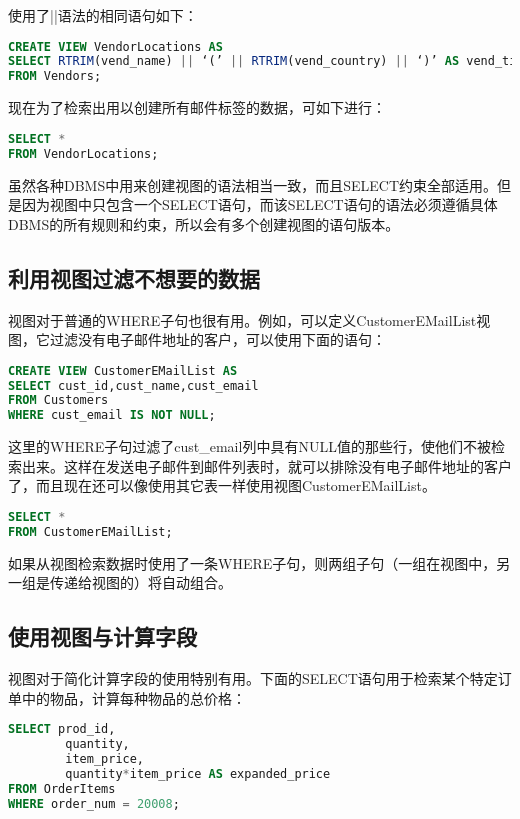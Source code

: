 使用了||语法的相同语句如下：

\begin{lstlisting}[language=SQL]
CREATE VIEW VendorLocations AS
SELECT RTRIM(vend_name) || ‘(’ || RTRIM(vend_country) || ‘)’ AS vend_title
FROM Vendors;
\end{lstlisting}

现在为了检索出用以创建所有邮件标签的数据，可如下进行：

\begin{lstlisting}[language=SQL]
SELECT *
FROM VendorLocations;
\end{lstlisting}

虽然各种DBMS中用来创建视图的语法相当一致，而且SELECT约束全部适用。但是因为视图中只包含一个SELECT语句，而该SELECT语句的语法必须遵循具体DBMS的所有规则和约束，所以会有多个创建视图的语句版本。


\subsection{利用视图过滤不想要的数据}


视图对于普通的WHERE子句也很有用。例如，可以定义CustomerEMailList视图，它过滤没有电子邮件地址的客户，可以使用下面的语句：

\begin{lstlisting}[language=SQL]
CREATE VIEW CustomerEMailList AS
SELECT cust_id,cust_name,cust_email
FROM Customers
WHERE cust_email IS NOT NULL;
\end{lstlisting}

这里的WHERE子句过滤了cust\_email列中具有NULL值的那些行，使他们不被检索出来。这样在发送电子邮件到邮件列表时，就可以排除没有电子邮件地址的客户了，而且现在还可以像使用其它表一样使用视图CustomerEMailList。

\begin{lstlisting}[language=SQL]
SELECT *
FROM CustomerEMailList;
\end{lstlisting}

如果从视图检索数据时使用了一条WHERE子句，则两组子句（一组在视图中，另一组是传递给视图的）将自动组合。

\subsection{使用视图与计算字段}

视图对于简化计算字段的使用特别有用。下面的SELECT语句用于检索某个特定订单中的物品，计算每种物品的总价格：

\begin{lstlisting}[language=SQL]
SELECT prod_id,
		quantity,
		item_price,
		quantity*item_price AS expanded_price
FROM OrderItems
WHERE order_num = 20008;
\end{lstlisting}

